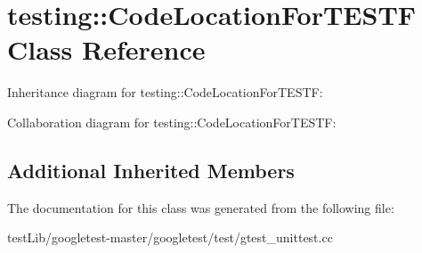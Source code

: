 \hypertarget{classtesting_1_1CodeLocationForTESTF}{}\section{testing\+:\+:Code\+Location\+For\+T\+E\+S\+TF Class Reference}
\label{classtesting_1_1CodeLocationForTESTF}


Inheritance diagram for testing\+:\+:Code\+Location\+For\+T\+E\+S\+TF\+:


Collaboration diagram for testing\+:\+:Code\+Location\+For\+T\+E\+S\+TF\+:
\subsection*{Additional Inherited Members}


The documentation for this class was generated from the following file\+:\begin{DoxyCompactItemize}
\item 
test\+Lib/googletest-\/master/googletest/test/gtest\+\_\+unittest.\+cc\end{DoxyCompactItemize}

